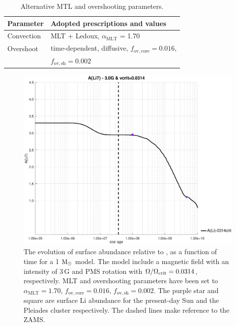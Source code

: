 \documentclass[fleqn,usenatbib]{mnras}
\begin{document}
\begin{table}
	\centering
	\caption{Alternative MTL and overshooting parameters.}
	\label{tab:phy_alt_mesa}
	\begin{tabular}{ll} 
		\hline
		Parameter & Adopted prescriptions and values\\
		\hline
		Convection & MLT + Ledoux, $\alpha_\mathrm{MLT}$ = 1.70\\
		Overshoot & time-dependent, diffusive, $f_\mathrm{ov,core}=0.016$, \\ & $f_\mathrm{ov,sh}=0.002$\\
		\hline
	\end{tabular}
\end{table}


\begin{figure}
	\includegraphics[trim = 35mm 15mm 20mm 15mm, clip,width=\columnwidth]{figures/li_3_0g_0314vc.eps}
    \caption{The evolution of surface  abundance relative to , as a function of time for a 1 $\mathrm{M}_\odot$ model. The model include a magnetic field with an intensity of 3\,G and PMS rotation with $\Omega / \Omega_{\mathrm{crit}}= 0.0314$, respectively. MLT and overshooting parameters have been set to $\alpha_\mathrm{MLT}=1.70$, $f_\mathrm{ov,core}=0.016$, $f_\mathrm{ov,sh}=0.002$. The purple star and square are surface Li abundance for the present-day Sun \citep{Asplund2009} and the Pleiades cluster \citep{Sestito2005} respectively. The dashed lines make reference to the ZAMS.}
    \label{fig:li_3_0g_0314vc}
\end{figure}
\end{document}
